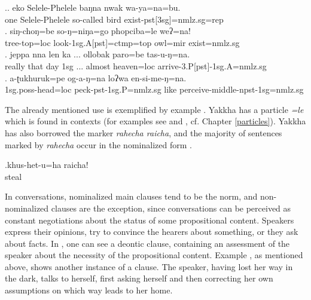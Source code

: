 \ex.\ag.  eko Selele-Phelele baŋna nwak wa-ya=na=bu.\\
one Selele-Phelele so-called bird exist{\sc -pst[3sg]=nmlz.sg=rep}\\
 
\bg. siŋ-choŋ=be        so-ŋ=niŋa=go              phopciba=le          weʔ=na!\\
tree-top{\sc =loc} look{\sc -1sg.A[pst]=ctmp=top} owl{\sc =mir} exist{\sc [3sg.npst]=nmlz.sg}\\
 
\bg. jeppa nna  len ka ... ollobak paro=be tas-u-ŋ=na.\\
really that day {\sc 1sg} ... almost heaven{\sc =loc} arrive{\sc -3.P[pst]-1sg.A=nmlz.sg}\\
 
\bg. a-ʈukhuruk=pe  og-a-ŋ=na loʔwa en-si-me-ŋ=na.\\
{\sc 1sg.poss-}head{\sc =loc} peck{\sc -pst-1sg.P=nmlz.sg} like perceive{\sc -middle-npst-1sg=nmlz.sg}\\
 


The already mentioned  use is exemplified by example \Next. Yakkha has a  particle \emph{=le} which is found in  contexts (for  examples see \Last[b] and \NNext[b], cf. Chapter \ref{particles}). Yakkha has also borrowed the   marker \emph{rahecha \ti raicha}, and the  majority of sentences marked by \emph{rahecha} occur in the nominalized form \Next.


\exg.khus-het-u=ha   raicha!\\
steal  \\
 

\largerpage
In conversations, nominalized main clauses tend to be  the norm, and non-nom\-i\-nal\-ized clauses are the exception, since conversations can be perceived as constant negotiations about the status of some propositional content. Speakers express their opinions, try to convince the hearers about something, or they ask about facts. In \Next[a], one can see a deontic clause, containing an assessment of the speaker about the necessity of the propositional content. Example \Next[b], as mentioned above, shows another instance of a  clause. The speaker, having lost her way in the dark, talks to herself, first asking herself and then correcting her own assumptions on which way leads to her home. 

